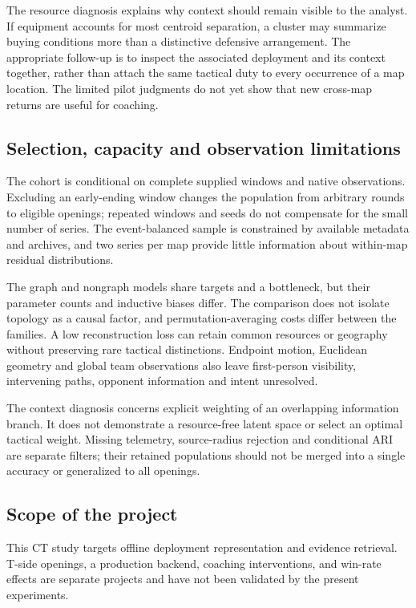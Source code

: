 The resource diagnosis explains why context should remain visible to the analyst. If equipment accounts for most centroid separation, a cluster may summarize buying conditions more than a distinctive defensive arrangement. The appropriate follow-up is to inspect the associated deployment and its context together, rather than attach the same tactical duty to every occurrence of a map location. The limited pilot judgments do not yet show that new cross-map returns are useful for coaching.

\subsection{Selection, capacity and observation limitations}
The cohort is conditional on complete supplied windows and native observations. Excluding an early-ending window changes the population from arbitrary rounds to eligible openings; repeated windows and seeds do not compensate for the small number of series. The event-balanced sample is constrained by available metadata and archives, and two series per map provide little information about within-map residual distributions.

The graph and nongraph models share targets and a bottleneck, but their parameter counts and inductive biases differ. The comparison does not isolate topology as a causal factor, and permutation-averaging costs differ between the families. A low reconstruction loss can retain common resources or geography without preserving rare tactical distinctions. Endpoint motion, Euclidean geometry and global team observations also leave first-person visibility, intervening paths, opponent information and intent unresolved.

The context diagnosis concerns explicit weighting of an overlapping information branch. It does not demonstrate a resource-free latent space or select an optimal tactical weight. Missing telemetry, source-radius rejection and conditional ARI are separate filters; their retained populations should not be merged into a single accuracy or generalized to all openings.

\subsection{Scope of the project}
This CT study targets offline deployment representation and evidence retrieval. T-side openings, a production backend, coaching interventions, and win-rate effects are separate projects and have not been validated by the present experiments.


